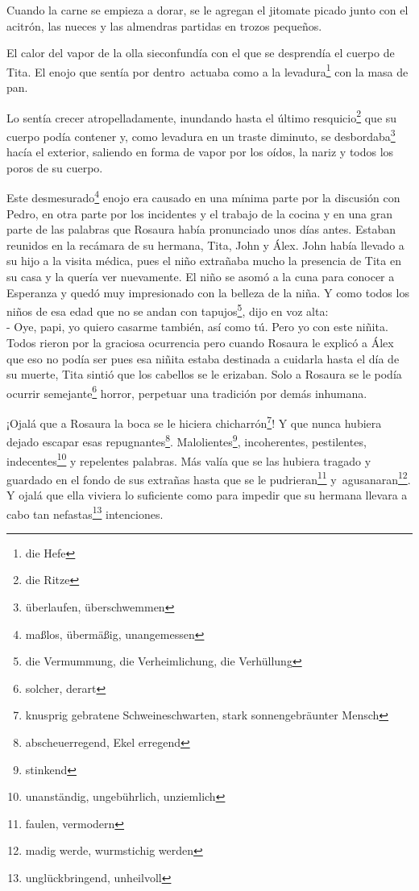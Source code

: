 Cuando la carne se empieza a dorar, se le agregan el jitomate picado
junto con el acitrón, las nueces y las almendras partidas en trozos
pequeños.

El calor del vapor de la olla sieconfundía con el que se desprendía el
cuerpo de Tita. El enojo que sentía por dentro~actuaba como a la levadura\footnote{die Hefe} con la masa de pan.

Lo sentía crecer atropelladamente, inundando hasta el último resquicio\footnote{die Ritze}
que su cuerpo podía contener y, como levadura en un traste diminuto, se desbordaba\footnote{überlaufen, überschwemmen} hacía el exterior,
saliendo en forma de vapor por los oídos, la nariz y todos los poros de
su cuerpo.

Este desmesurado\footnote{maßlos, übermäßig, unangemessen}
enojo era causado en una mínima parte por la discusión
con Pedro, en otra parte por los incidentes y el trabajo de la cocina y
en una gran parte de las palabras que Rosaura había pronunciado unos
días antes. Estaban reunidos en la recámara de su hermana, Tita, John
y Álex. John había llevado a su hijo a la visita médica, pues el niño
extrañaba mucho la presencia de Tita en su casa y la quería ver
nuevamente. El niño se asomó a la cuna para conocer a Esperanza y quedó
muy impresionado con la belleza de la niña. Y como todos los niños de
esa edad que no se andan con tapujos\footnote{die Vermummung, die Verheimlichung, die Verhüllung},
dijo en voz alta:
\\- Oye, papi, yo quiero casarme también, así como tú. Pero yo con este %
niñita.\\

Todos rieron por la graciosa ocurrencia pero cuando Rosaura le explicó a
Álex que eso no podía ser pues esa niñita estaba destinada a cuidarla
hasta el día de su muerte, Tita sintió que los cabellos se le erizaban.
Solo a Rosaura se le podía ocurrir semejante\footnote{solcher, derart}
horror, perpetuar una tradición por demás inhumana.

¡Ojalá que a Rosaura la boca se le hiciera chicharrón\footnote{knusprig gebratene Schweineschwarten, stark sonnengebräunter Mensch}!
Y que nunca hubiera dejado escapar esas repugnantes\footnote{abscheuerregend, Ekel erregend}. Malolientes\footnote{stinkend}, incoherentes,
pestilentes, indecentes\footnote{unanständig, ungebührlich, unziemlich}
y repelentes palabras. Más valía que se las hubiera tragado y guardado
en el fondo de sus extrañas hasta que se le pudrieran\footnote{faulen, vermodern}
y~agusanaran\footnote{madig werde, wurmstichig werden}.
Y ojalá que ella viviera lo suficiente como para impedir que su hermana
llevara a cabo tan nefastas\footnote{unglückbringend, unheilvoll}
intenciones.

